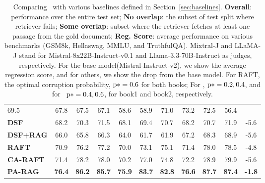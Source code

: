 \begin{table*}[]
{\begin{tabular}{@{}l|cccccccccc@{}}
  69.5 &
  67.8 &
  \multicolumn{1}{c|}{67.5} &
  67.1 &
  58.6 &
  \multicolumn{1}{c|}{58.9} &
  71.0 &
  73.2 &
  \multicolumn{1}{c|}{72.5} &
  56.4 \\
\textbf{DSF} &
  68.2 &
  70.3 &
  \multicolumn{1}{c|}{71.5} &
  68.1 &
  69.4 &
  \multicolumn{1}{c|}{70.7} &
  68.2 &
  70.7 &
  \multicolumn{1}{c|}{71.9} &
  -5.6 \\
\textbf{DSF+RAG} &
  66.0 &
  65.8 &
  \multicolumn{1}{c|}{66.3} &
  64.0 &
  61.7 &
  \multicolumn{1}{c|}{61.9} &
  67.2 &
  68.3 &
  \multicolumn{1}{c|}{68.9} &
  -5.6 \\
\textbf{RAFT} &
  70.9 &
  76.2 &
  \multicolumn{1}{c|}{77.2} &
  70.0 &
  73.1 &
  \multicolumn{1}{c|}{75.1} &
  71.4 &
  78.0 &
  \multicolumn{1}{c|}{78.5} &
  -4.8 \\
\textbf{CA-RAFT} &
  71.4 &
  78.2 &
  \multicolumn{1}{c|}{78.0} &
  70.2 &
  77.0 &
  \multicolumn{1}{c|}{74.8} &
  72.2 &
  78.9 &
  \multicolumn{1}{c|}{79.9} &
  -5.6 \\
\textbf{PA-RAG} &
  \textbf{76.4} &
  \textbf{86.2} &
  \multicolumn{1}{c|}{\textbf{85.7}} &
  \textbf{75.9} &
  \textbf{83.7} &
  \multicolumn{1}{c|}{\textbf{82.8}} &
  \textbf{76.6} &
  \textbf{87.7} &
  \multicolumn{1}{c|}{\textbf{87.4}} &
  \textbf{-1.8} \\ \bottomrule
\end{tabular}
}
\caption{Comparing \ourmethodshort\ with various baselines defined in Section~\ref{sec:baselines}. 
\textbf{Overall}: performance over the entire test set;
\textbf{No overlap}: the subset of test split where retriever fails;
\textbf{Some overlap}: subset where the retriever fetches at least one passage from the gold document;
\textbf{Reg. Score}: average performance on various benchmarks (GSM8k, Hellaswag, MMLU, and TruthfulQA). Mixtral-J and LLaMA-J stand for Mistral-8x22B-Instruct-v0.1 and Llama-3.3-70B-Instruct as judges, respectively. For the base model(Mistral-Instruct-v2), we show the average regression score, and for others, we show the drop from the base model. 
For RAFT, the optimal corruption probability, $\mathrm{p}* = 0.6$ for both books;
For \raftmix, $\mathrm{p}* = 0.2, 0.4$, and for \ourmethodshort\, $\mathrm{p}* = 0.4, 0.6$, for book1 and book2, respectively.
}
\label{tab:main_table_breakup}
\end{table*}